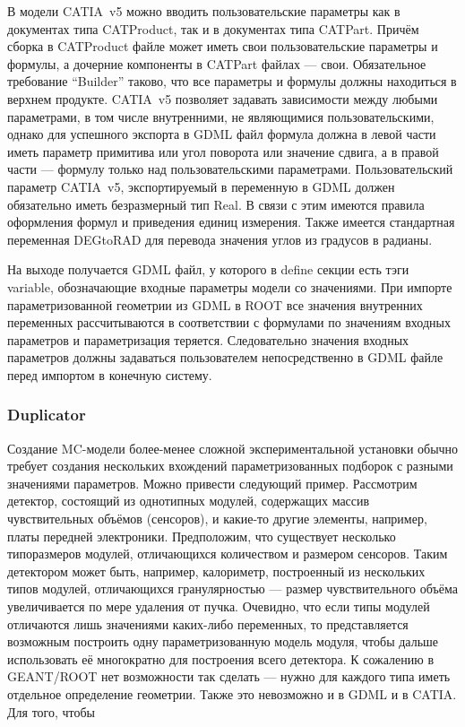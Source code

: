 В модели CATIA~v5 можно вводить пользовательские параметры как в документах типа CATProduct, так и в документах типа CATPart. Причём сборка в CATProduct файле может иметь свои пользовательские параметры и формулы, а дочерние компоненты в CATPart файлах --- свои. Обязательное требование ``Builder'' таково, что все параметры и формулы должны находиться в верхнем продукте. CATIA~v5 позволяет задавать зависимости между любыми параметрами, в том числе внутренними, не являющимися пользовательскими, однако для успешного экспорта в GDML файл формула должна в левой части иметь параметр примитива или угол поворота или значение сдвига, а в правой части --- формулу только над пользовательскими параметрами. Пользовательский параметр CATIA~v5, экспортируемый в переменную в GDML должен обязательно иметь безразмерный тип Real. В связи с этим имеются правила оформления формул и приведения единиц измерения. Также имеется стандартная переменная DEGtoRAD для перевода значения углов из градусов в радианы.

На выходе получается GDML файл, у которого в define секции есть тэги variable, обозначающие входные параметры модели со значениями. При импорте параметризованной геометрии из GDML в ROOT все значения внутренних переменных рассчитываются в соответствии с формулами по значениям входных параметров и параметризация теряется. Следовательно значения входных параметров должны задаваться пользователем непосредственно в GDML файле перед импортом в конечную систему.

\subsubsection{Duplicator}\label{sec:Duplicator}

Создание MC-модели более-менее сложной экспериментальной установки обычно требует создания нескольких вхождений параметризованных подборок с разными значениями параметров. Можно привести следующий пример. Рассмотрим детектор, состоящий из однотипных модулей, содержащих массив чувствительных объёмов (сенсоров), и какие-то другие элементы, например, платы передней электроники. Предположим, что существует несколько типоразмеров модулей, отличающихся количеством и размером сенсоров. Таким детектором может быть, например, калориметр, построенный из нескольких типов модулей, отличающихся гранулярностью --- размер чувствительного объёма увеличивается по мере удаления от пучка. Очевидно, что если типы модулей отличаются лишь значениями каких-либо переменных, то представляется возможным построить одну параметризованную модель модуля, чтобы дальше использовать её многократно для построения всего детектора. К сожалению в GEANT/ROOT нет возможности так сделать --- нужно для каждого типа иметь отдельное определение геометрии. Также это невозможно и в GDML и в CATIA.
Для того, чтобы 


